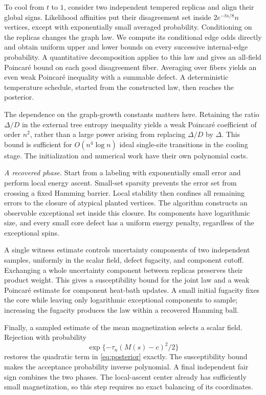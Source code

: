 \documentclass[11pt]{article}
\numberwithin{equation}{section}
\begin{document}
To cool from $t$ to $1$, consider two independent tempered replicas and align their global signs. Likelihood affinities put their disagreement set inside $2e^{-t\kappa/8}n$ vertices, except with exponentially small averaged probability. Conditioning on the replicas changes the graph law. We compute its conditional edge odds directly and obtain uniform upper and lower bounds on every successive internal-edge probability. A quantitative decomposition applies to this law and gives an all-field Poincar\'e bound on each good disagreement fiber. Averaging over fibers yields an even weak Poincar\'e inequality with a summable defect. A deterministic temperature schedule, started from the constructed law, then reaches the posterior.

The dependence on the graph-growth constants matters here. Retaining the ratio $\Delta/D$ in the external tree entropy inequality yields a weak Poincar\'e coefficient of order $n^2$, rather than a large power arising from replacing $\Delta/D$ by $\Delta$. This bound is sufficient for $O(n^4\log n)$ ideal single-site transitions in the cooling stage. The initialization and numerical work have their own polynomial costs.

\emph{A recovered phase.} Start from a labeling with exponentially small error and perform local energy ascent. Small-set sparsity prevents the error set from crossing a fixed Hamming barrier. Local stability then confines all remaining errors to the closure of atypical planted vertices. The algorithm constructs an observable exceptional set inside this closure. Its components have logarithmic size, and every small core defect has a uniform energy penalty, regardless of the exceptional spins.

A single witness estimate controls uncertainty components of two independent samples, uniformly in the scalar field, defect fugacity, and component cutoff. Exchanging a whole uncertainty component between replicas preserves their product weight. This gives a susceptibility bound for the joint law and a weak Poincar\'e estimate for component heat-bath updates. A small initial fugacity fixes the core while leaving only logarithmic exceptional components to sample; increasing the fugacity produces the law within a recovered Hamming ball.

Finally, a sampled estimate of the mean magnetization selects a scalar field. Rejection with probability
\[
 \exp\{-\tau_n(M(s)-c)^2/2\}
\]
restores the quadratic term in \eqref{eq:posterior} exactly. The susceptibility bound makes the acceptance probability inverse polynomial. A final independent fair sign combines the two phases. The local-ascent center already has sufficiently small magnetization, so this step requires no exact balancing of its coordinates.
\end{document}
